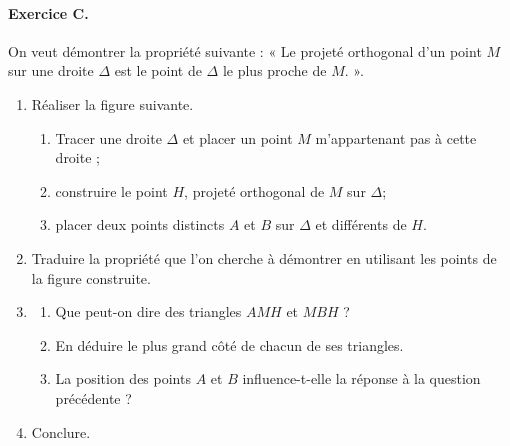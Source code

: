 \documentclass[11pt]{article}
\begin{document}
\paragraph{Exercice C.} On veut démontrer la propriété suivante : « Le projeté
orthogonal d'un point $M$ sur une droite $\Delta$ est le point de $\Delta$ le
plus proche de $M$. ».
\begin{enumerate}
  \item Réaliser la figure suivante.
    \begin{enumerate}
      \item Tracer une droite $\Delta$ et placer un point $M$ m'appartenant pas
        à cette droite ;
      \item construire le point $H$, projeté orthogonal de $M$ sur $\Delta$;
      \item placer deux points distincts $A$ et $B$ sur $\Delta$ et différents
        de $H$.
    \end{enumerate}
  \item Traduire la propriété que l'on cherche à démontrer en utilisant les
    points de la figure construite.
    \item \begin{enumerate}
        \item Que peut-on dire des triangles $AMH$ et $MBH$ ?
        \item En déduire le plus grand côté de chacun de ses triangles.
        \item La position des points $A$ et $B$ influence-t-elle la réponse à la
          question précédente ?
      \end{enumerate}
    \item Conclure.
\end{enumerate}
\end{document}
